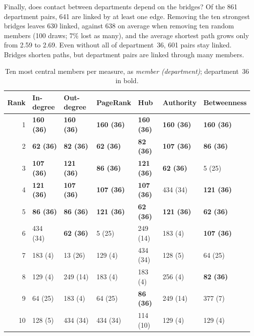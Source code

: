 Finally, does contact between departments depend on the bridges? Of the 861
department pairs, 641 are linked by at least one edge. Removing the ten
strongest bridges leaves 630 linked, against 638 on average when removing
ten random members (100 draws; 7\% lost as many), and the average shortest
path grows only from 2.59 to 2.69. Even without all of department~36, 601
pairs stay linked. Bridges shorten paths, but department pairs are linked
through many members.

\begin{table}[ht]
\centering
\small
\begin{tabular}{rllllll}
\toprule
Rank & In-degree & Out-degree & PageRank & Hub & Authority & Betweenness \\
\midrule
1 & \textbf{160 (36)} & \textbf{160 (36)} & \textbf{160 (36)} & \textbf{160 (36)} & \textbf{160 (36)} & \textbf{160 (36)} \\
2 & \textbf{62 (36)} & \textbf{82 (36)} & \textbf{62 (36)} & \textbf{82 (36)} & \textbf{107 (36)} & \textbf{86 (36)} \\
3 & \textbf{107 (36)} & \textbf{121 (36)} & \textbf{86 (36)} & \textbf{121 (36)} & \textbf{62 (36)} & 5 (25) \\
4 & \textbf{121 (36)} & \textbf{107 (36)} & \textbf{107 (36)} & \textbf{107 (36)} & 434 (34) & \textbf{121 (36)} \\
5 & \textbf{86 (36)} & \textbf{86 (36)} & \textbf{121 (36)} & \textbf{62 (36)} & \textbf{121 (36)} & \textbf{62 (36)} \\
6 & 434 (34) & \textbf{62 (36)} & 5 (25) & 249 (14) & 183 (4) & \textbf{107 (36)} \\
7 & 183 (4) & 13 (26) & 129 (4) & 434 (34) & 128 (5) & 64 (25) \\
8 & 129 (4) & 249 (14) & 183 (4) & 183 (4) & 256 (4) & \textbf{82 (36)} \\
9 & 64 (25) & 183 (4) & 64 (25) & \textbf{86 (36)} & 249 (14) & 377 (7) \\
10 & 128 (5) & 434 (34) & 434 (34) & 114 (10) & 129 (4) & 129 (4) \\
\bottomrule
\end{tabular}
\caption{Ten most central members per measure, as \emph{member
(department)}; department~36 in bold.}
\label{tab:top10}
\end{table}

